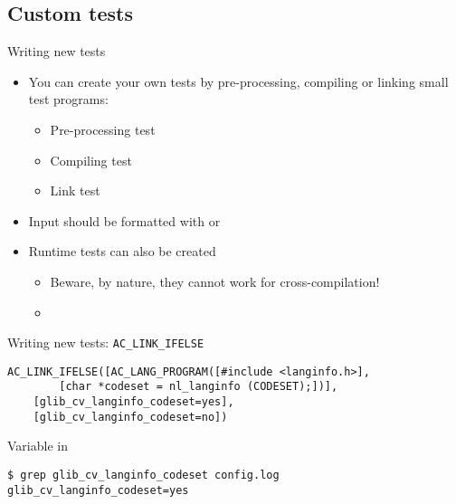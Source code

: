 \subsection{Custom tests}

\begin{frame}{Writing new tests}
  \begin{itemize}
  \item You can create your own tests by pre-processing, compiling or
    linking small test programs:
    \begin{itemize}
    \item Pre-processing test\\
      {\small {}}
    \item Compiling test\\
      {\small {}}
    \item Link test\\
      {\small {}}
    \end{itemize}
  \item Input should be formatted with  or
  \item Runtime tests can also be created
    \begin{itemize}
    \item Beware, by nature, they cannot work for cross-compilation!
    \item {}
    \end{itemize}
  \end{itemize}
\end{frame}

\begin{frame}[fragile]{Writing new tests: {\tt AC\_LINK\_IFELSE}}

\begin{block}{}
\begin{verbatim}
AC_LINK_IFELSE([AC_LANG_PROGRAM([#include <langinfo.h>],
        [char *codeset = nl_langinfo (CODESET);])],
    [glib_cv_langinfo_codeset=yes],
    [glib_cv_langinfo_codeset=no])
\end{verbatim}
\end{block}

\begin{block}{Variable in }
\begin{verbatim}
$ grep glib_cv_langinfo_codeset config.log
glib_cv_langinfo_codeset=yes
\end{verbatim}
\end{block}

\end{frame}


